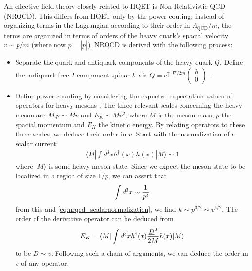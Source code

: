An effective field theory closely related to HQET is Non-Relativistic QCD (NRQCD). This differs from HQET only by the power couting; instead of organizing terms in the Lagrangian according to their order in $\Lambda_{\text{QCD}}/m$, the terms are organized in terms of orders of the heavy quark's spacial velocity $v \sim p/m$ (where now $p=|\underline{p}|$). NRQCD is derived with the following process:
\begin{itemize}
\item
Separate the quark and antiquark components of the heavy quark $Q$. Define the antiquark-free 2-component spinor $h$ via $Q = e^{\underline{\gamma}\cdot \underline{\nabla}/2m}\begin{pmatrix} h\\ 0 \end{pmatrix}$ \cite{PhysRev.78.29}.
\item
Define power-counting by considering the expected expectation values of operators for heavy mesons \cite{Lepage:1992tx}. The three relevant scales concerning the heavy meson are $M$,$p\sim Mv$ and $E_K\sim Mv^2$, where $M$ is the meson mass, $p$ the spacial momentum and $E_K$ the kinetic energy. By relating operators to these three scales, we deduce their order in $v$. Start with the normalization of a scalar current:
\begin{align}
	\langle M | \int d^3x h^{\dagger}(x) h(x) | M \rangle \sim 1
	\label{eq:nrqcd_scalarnormalization}
\end{align}
where $| M \rangle$ is some heavy meson state. Since we expect the meson state to be localized in a region of size $1/p$, we can assert that
\begin{align}
	\int d^3x \sim {1\over p^3}
\end{align}
from this and \eqref{eq:nrqcd_scalarnormalization}, we find $h \sim p^{3/2} \sim v^{3/2}$. 
The order of the derivative operator can be deduced from
\begin{align}
	E_K = \langle M | \int d^3x h^{\dagger}(x) {\underline{D}^2\over 2M} h(x) | M \rangle
\end{align}
to be $D \sim v$. Following such a chain of arguments, we can deduce the order in $v$ of any operator.


\end{itemize}
